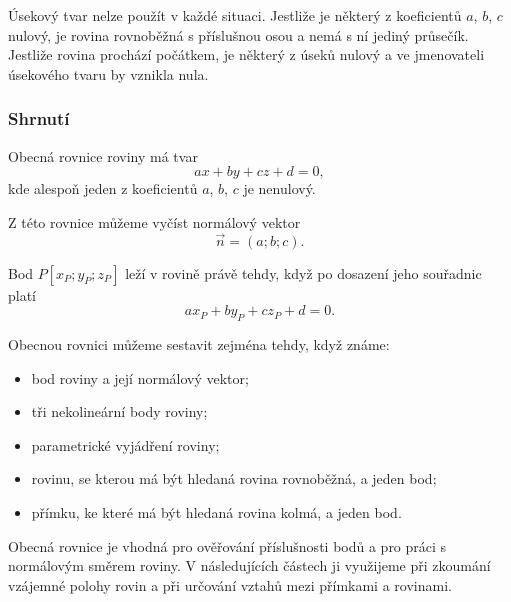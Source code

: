 Úsekový tvar nelze použít v každé situaci. Jestliže je některý
z koeficientů $a$, $b$, $c$ nulový, je rovina rovnoběžná s příslušnou
osou a nemá s ní jediný průsečík. Jestliže rovina prochází počátkem,
je některý z úseků nulový a ve jmenovateli úsekového tvaru by vznikla
nula.

\subsubsection{Shrnutí}
\label{subsubsec:General_plane_summary}

Obecná rovnice roviny má tvar
\[
    ax+by+cz+d=0,
\]
kde alespoň jeden z koeficientů $a$, $b$, $c$ je nenulový.

Z této rovnice můžeme vyčíst normálový vektor
\[
    \vec{n}=(a;b;c).
\]

Bod $P[x_P;y_P;z_P]$ leží v rovině právě tehdy, když po dosazení jeho
souřadnic platí
\[
    ax_P+by_P+cz_P+d=0.
\]

Obecnou rovnici můžeme sestavit zejména tehdy, když známe:

\begin{itemize}
    \item bod roviny a její normálový vektor;
    \item tři nekolineární body roviny;
    \item parametrické vyjádření roviny;
    \item rovinu, se kterou má být hledaná rovina rovnoběžná, a jeden bod;
    \item přímku, ke které má být hledaná rovina kolmá, a jeden bod.
\end{itemize}

Obecná rovnice je vhodná pro ověřování příslušnosti bodů a pro práci
s normálovým směrem roviny. V následujících částech ji využijeme při
zkoumání vzájemné polohy rovin a při určování vztahů mezi přímkami
a rovinami.
